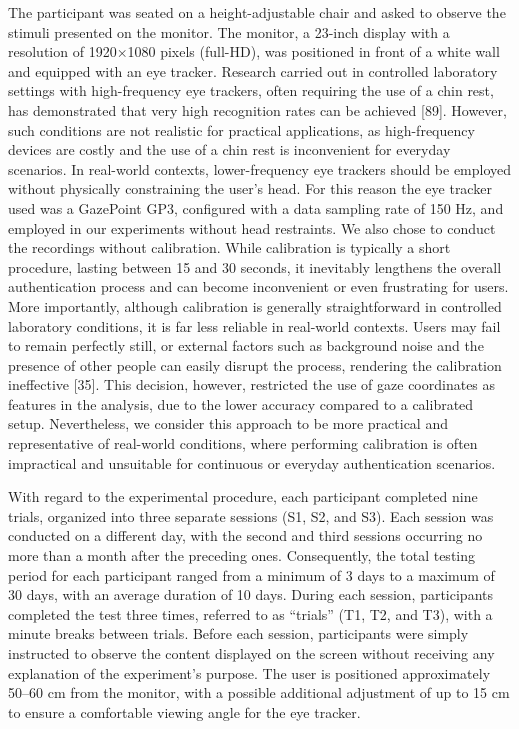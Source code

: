 \documentclass{article}
\begin{document}
The participant was seated on a height-adjustable chair and asked to observe the stimuli presented on the monitor. 
The monitor, a 23-inch display with a resolution of 1920×1080 pixels (full-HD), was positioned in front of a white wall and equipped with an eye tracker. 
Research carried out in controlled laboratory settings with high-frequency eye trackers, often requiring the use of a chin rest, has demonstrated that very high recognition rates can be achieved [89].
However, such conditions are not realistic for practical applications, as high-frequency devices are costly and the use of a chin rest is inconvenient for everyday scenarios. 
In real-world contexts, lower-frequency eye trackers should be employed without physically constraining the user's head. 
For this reason the eye tracker used was a GazePoint GP3, configured with a data sampling rate of 150 Hz, and employed in our experiments without head restraints.
We also chose to conduct the recordings without calibration. 
While calibration is typically a short procedure, lasting between 15 and 30 seconds, it inevitably lengthens the overall authentication process and can become inconvenient or even frustrating for users. 
More importantly, although calibration is generally straightforward in controlled laboratory conditions, it is far less reliable in real-world contexts. 
Users may fail to remain perfectly still, or external factors such as background noise and the presence of other people can easily disrupt the process, rendering the calibration ineffective [35].
This decision, however, restricted the use of gaze coordinates as features in the analysis, due to the lower accuracy compared to a calibrated setup.
Nevertheless, we consider this approach to be more practical and representative of real-world conditions, where performing calibration is often impractical and unsuitable for continuous or everyday authentication scenarios.

With regard to the experimental procedure, each participant completed nine trials, organized into three separate sessions (S1, S2, and S3).
Each session was conducted on a different day, with the second and third sessions occurring no more than a month after the preceding ones. 
Consequently, the total testing period for each participant ranged from a minimum of 3 days to a maximum of 30 days, with an average duration of 10 days.
During each session, participants completed the test three times, referred to as “trials” (T1, T2, and T3), with a minute breaks between trials. 
Before each session, participants were simply instructed to observe the content displayed on the screen without receiving any explanation of the experiment's purpose.
The user is positioned approximately 50–60 cm from the monitor, with a possible additional adjustment of up to 15 cm to ensure a comfortable viewing angle for the eye tracker.
\end{document}
